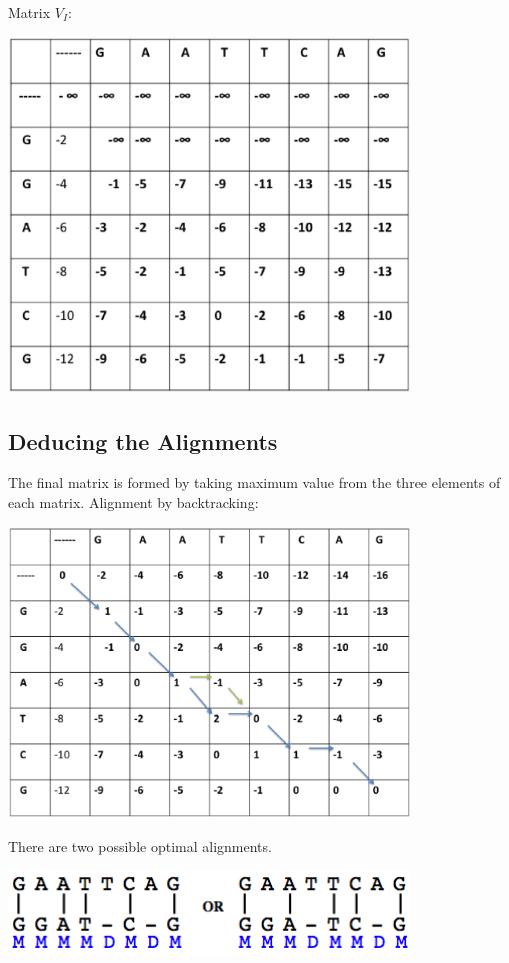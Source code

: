 \documentclass[english, a4paper,11pt]{article}
\begin{document}
Matrix $V_I$:
\begin{center}

\includegraphics[width=0.8\textwidth]{Slide3.eps}
\end{center}

\subsection{Deducing the Alignments}

The final matrix is formed by taking maximum value from the three elements of each matrix.
\newpage
Alignment by backtracking:
\begin{center}
\includegraphics[width=0.8\textwidth]{Slide4.eps}
\end{center}

There are two possible optimal alignments.

\begin{center}
\includegraphics[width=0.8\textwidth]{alignment2.png}
\end{center}
\end{document}
